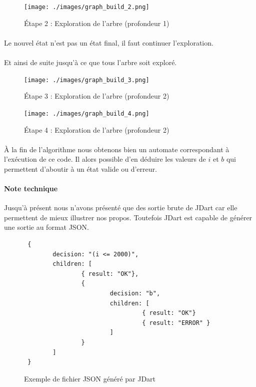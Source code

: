 \begin{figure}[H]
  \centering
  \texttt{[image: ./images/graph\_build\_2.png]}
  \caption{Étape 2 : Exploration de l'arbre (profondeur 1)}
 \end{figure}
 \paragraph{} Le nouvel état n'est pas un état final, il faut continuer 
l'exploration.
 \paragraph{} Et ainsi de suite jusqu'à ce que tous l'arbre soit exploré.


 \begin{figure}[H]
  \centering
  \texttt{[image: ./images/graph\_build\_3.png]}
  \caption{Étape 3 : Exploration de l'arbre (profondeur 2)}
 \end{figure}

\begin{figure}[H]
  \centering
  \texttt{[image: ./images/graph\_build\_4.png]}
  \caption{Étape 4 : Exploration de l'arbre (profondeur 2)}
 \end{figure}


\paragraph{}
À la fin de l'algorithme nous obtenons bien un automate correspondant à 
l'exécution de ce code. Il alors possible d'en déduire les valeurs de $i$ et 
$b$ qui permettent d'aboutir à un état valide ou d'erreur.

\paragraph{Note technique}
Jusqu'à présent nous n'avons présenté que des sortie brute de JDart car elle 
permettent de mieux illustrer nos propos. Toutefois JDart est capable de 
générer une sortie au format JSON.

\begin{figure}[H]
 \centering
 \begin{verbatim}
 {
        decision: "(i <= 2000)",
        children: [
                { result: "OK"},
                { 
                        decision: "b",
                        children: [
                                 { result: "OK"}
                                 { result: "ERROR" }
                        ]
                }
        ]
 }
 \end{verbatim}
 \caption{Exemple de fichier JSON généré par JDart}
\end{figure}


